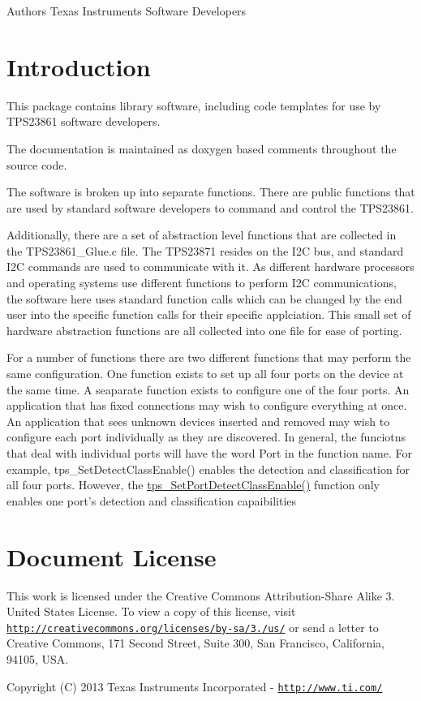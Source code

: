 \begin{DoxyAuthor}{Authors}
Texas Instruments Software Developers
\end{DoxyAuthor}
\hypertarget{index_intro}{}\section{Introduction}\label{index_intro}
This package contains library software, including code templates for use by T\-P\-S23861 software developers.

The documentation is maintained as doxygen based comments throughout the source code.

The software is broken up into separate functions. There are public functions that are used by standard software developers to command and control the T\-P\-S23861.

Additionally, there are a set of abstraction level functions that are collected in the T\-P\-S23861\-\_\-\-Glue.\-c file. The T\-P\-S23871 resides on the I2\-C bus, and standard I2\-C commands are used to communicate with it. As different hardware processors and operating systems use different functions to perform I2\-C communications, the software here uses standard function calls which can be changed by the end user into the specific function calls for their specific applciation. This small set of hardware abstraction functions are all collected into one file for ease of porting.

For a number of functions there are two different functions that may perform the same configuration. One function exists to set up all four ports on the device at the same time. A seaparate function exists to configure one of the four ports. An application that has fixed connections may wish to configure everything at once. An application that sees unknown devices inserted and removed may wish to configure each port individually as they are discovered. In general, the funciotns that deal with individual ports will have the word Port in the function name. For example, tps\-\_\-\-Set\-Detect\-Class\-Enable() enables the detection and classification for all four ports. However, the \hyperlink{_t_p_s23861_8c_a60e64452aad48caf62d2e2e590471666}{tps\-\_\-\-Set\-Port\-Detect\-Class\-Enable()} function only enables one port's detection and classification capaibilities\hypertarget{index_license}{}\section{Document License}\label{index_license}
This work is licensed under the Creative Commons Attribution-\/\-Share Alike 3. United States License. To view a copy of this license, visit \href{http://creativecommons.org/licenses/by-sa/3.0/us/}{\tt http\-://creativecommons.\-org/licenses/by-\/sa/3./us/} or send a letter to Creative Commons, 171 Second Street, Suite 300, San Francisco, California, 94105, U\-S\-A.

Copyright (C) 2013 Texas Instruments Incorporated -\/ \href{http://www.ti.com/}{\tt http\-://www.\-ti.\-com/} 